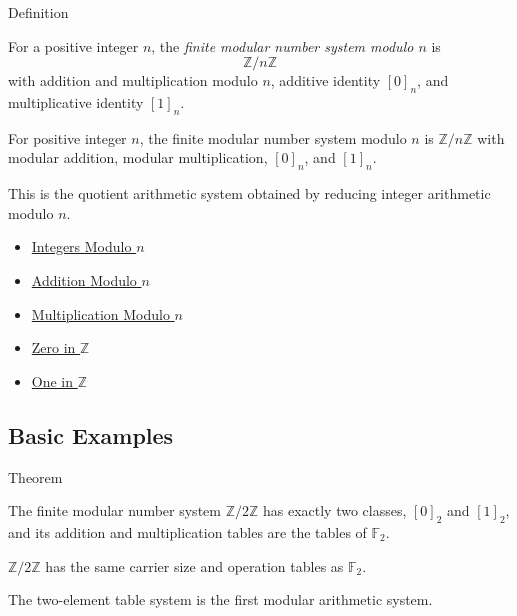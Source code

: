 \begin{definitionbox}{Definition}
\begin{definition}
\label{def:finite-modular-number-system}
For a positive integer \(n\), the \emph{finite modular number system modulo
\(n\)} is
\[
\mathbb{Z}/n\mathbb{Z}
\]
with addition and multiplication modulo \(n\), additive identity \([0]_n\),
and multiplicative identity \([1]_n\).
\end{definition}

\begin{remark*}
For positive integer \(n\), the finite modular number system modulo \(n\) is
\(\mathbb{Z}/n\mathbb{Z}\) with modular addition, modular multiplication,
\([0]_n\), and \([1]_n\).
\end{remark*}

\begin{remark*}[Interpretation]
This is the quotient arithmetic system obtained by reducing integer
arithmetic modulo \(n\).
\end{remark*}
\end{definitionbox}

\begin{dependencies}
\begin{itemize}
  \item \hyperref[def:integers-modulo-n]{Integers Modulo \(n\)}
  \item \hyperref[def:addition-modulo-n]{Addition Modulo \(n\)}
  \item \hyperref[def:multiplication-modulo-n]{Multiplication Modulo \(n\)}
  \item \hyperref[def:zero-in-z]{Zero in \(\mathbb{Z}\)}
  \item \hyperref[def:one-in-z]{One in \(\mathbb{Z}\)}
\end{itemize}
\end{dependencies}

\subsection*{Basic Examples}

\begin{theorembox}{Theorem}
\begin{theorem}
\label{thm:z-mod-two-is-two-element-system}
The finite modular number system \(\mathbb{Z}/2\mathbb{Z}\) has exactly two
classes, \([0]_2\) and \([1]_2\), and its addition and multiplication tables
are the tables of \(\mathbb{F}_2\).
\end{theorem}

\begin{remark*}
\(\mathbb{Z}/2\mathbb{Z}\) has the same carrier size and operation tables as
\(\mathbb{F}_2\).
\end{remark*}

\begin{remark*}[Interpretation]
The two-element table system is the first modular arithmetic system.
\end{remark*}
\end{theorembox}

